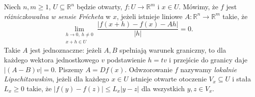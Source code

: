 \begin{definicja}
\label{def:frechet-rademacher-28}
Niech $n,m\ge1$, $U\subseteq\mathbb R^n$ będzie otwarty,
$f:U\to\mathbb R^m$ i $x\in U$. Mówimy, że $f$ jest
\emph{różniczkowalna w sensie Frécheta} w $x$, jeżeli istnieje
liniowe $A:\mathbb R^n\to\mathbb R^m$ takie, że
\[
 \lim_{\substack{h\to0,\ h\ne0\\x+h\in U}}
 \frac{|f(x+h)-f(x)-Ah|}{|h|}=0.
\]
Takie $A$ jest jednoznaczne: jeżeli $A,B$ spełniają
warunek graniczny, to dla każdego wektora jednostkowego $v$
podstawienie $h=tv$ i przejście do granicy daje
$|(A-B)v|=0$. Piszemy $A=Df(x)$.
Odwzorowanie $f$ nazywamy \emph{lokalnie Lipschitzowskim},
jeżeli dla każdego $x\in U$ istnieje otwarte otoczenie
$V_x\subseteq U$ i stała $L_x\ge0$ takie, że
$|f(y)-f(z)|\le L_x|y-z|$ dla wszystkich $y,z\in V_x$.
\end{definicja}

